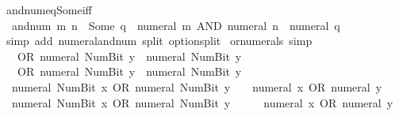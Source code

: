 \begin{isabellebody}
\endisatagproof
{\isafoldproof}%
%
\isadelimproof
\isanewline
%
\endisadelimproof
\isanewline
{}\isamarkupfalse%
\ and{\isacharunderscore}{\kern0pt}num{\isacharunderscore}{\kern0pt}eq{\isacharunderscore}{\kern0pt}Some{\isacharunderscore}{\kern0pt}iff{\isacharcolon}{\kern0pt}\isanewline
\ \ {\isacartoucheopen}and{\isacharunderscore}{\kern0pt}num\ m\ n\ {\isacharequal}{\kern0pt}\ Some\ q\ {\isasymlongleftrightarrow}\ numeral\ m\ AND\ numeral\ n\ {\isacharequal}{\kern0pt}\ numeral\ q{\isacartoucheclose}\isanewline
%
\isadelimproof
\ \ %
\endisadelimproof
%
\isatagproof
{}\isamarkupfalse%
\ {\isacharparenleft}{\kern0pt}simp\ add{\isacharcolon}{\kern0pt}\ numeral{\isacharunderscore}{\kern0pt}and{\isacharunderscore}{\kern0pt}num\ split{\isacharcolon}{\kern0pt}\ option{\isachardot}{\kern0pt}split{\isacharparenright}{\kern0pt}%
\endisatagproof
{\isafoldproof}%
%
\isadelimproof
\isanewline
%
\endisadelimproof
\isanewline
{}\isamarkupfalse%
\ or{\isacharunderscore}{\kern0pt}numerals\ {\isacharbrackleft}{\kern0pt}simp{\isacharbrackright}{\kern0pt}{\isacharcolon}{\kern0pt}\isanewline
\ \ {\isacartoucheopen}{}\ OR\ numeral\ {\isacharparenleft}{\kern0pt}Num{\isachardot}{\kern0pt}Bit{}\ y{\isacharparenright}{\kern0pt}\ {\isacharequal}{\kern0pt}\ numeral\ {\isacharparenleft}{\kern0pt}Num{\isachardot}{\kern0pt}Bit{}\ y{\isacharparenright}{\kern0pt}{\isacartoucheclose}\isanewline
\ \ {\isacartoucheopen}{}\ OR\ numeral\ {\isacharparenleft}{\kern0pt}Num{\isachardot}{\kern0pt}Bit{}\ y{\isacharparenright}{\kern0pt}\ {\isacharequal}{\kern0pt}\ numeral\ {\isacharparenleft}{\kern0pt}Num{\isachardot}{\kern0pt}Bit{}\ y{\isacharparenright}{\kern0pt}{\isacartoucheclose}\isanewline
\ \ {\isacartoucheopen}numeral\ {\isacharparenleft}{\kern0pt}Num{\isachardot}{\kern0pt}Bit{}\ x{\isacharparenright}{\kern0pt}\ OR\ numeral\ {\isacharparenleft}{\kern0pt}Num{\isachardot}{\kern0pt}Bit{}\ y{\isacharparenright}{\kern0pt}\ {\isacharequal}{\kern0pt}\ {}\ {\isacharasterisk}{\kern0pt}\ {\isacharparenleft}{\kern0pt}numeral\ x\ OR\ numeral\ y{\isacharparenright}{\kern0pt}{\isacartoucheclose}\isanewline
\ \ {\isacartoucheopen}numeral\ {\isacharparenleft}{\kern0pt}Num{\isachardot}{\kern0pt}Bit{}\ x{\isacharparenright}{\kern0pt}\ OR\ numeral\ {\isacharparenleft}{\kern0pt}Num{\isachardot}{\kern0pt}Bit{}\ y{\isacharparenright}{\kern0pt}\ {\isacharequal}{\kern0pt}\ {}\ {\isacharplus}{\kern0pt}\ {}\ {\isacharasterisk}{\kern0pt}\ {\isacharparenleft}{\kern0pt}numeral\ x\ OR\ numeral\ y{\isacharparenright}{\kern0pt}{\isacartoucheclose}\isanewline

\end{isabellebody}
